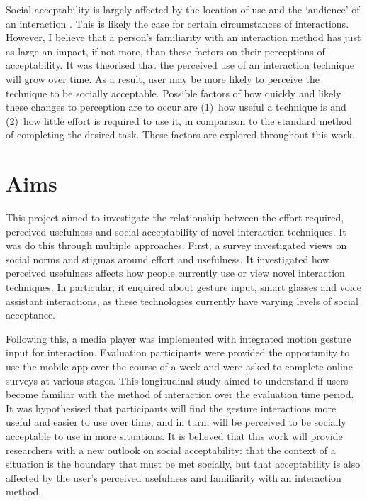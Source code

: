 \documentclass{l4proj}
\begin{document}
Social acceptability is largely affected by the location of use and the `audience' of an interaction \citep{rico_usable_2010}. This is likely the case for certain circumstances of interactions. However, I believe that a person’s familiarity with an interaction method has just as large an impact, if not more, than these factors on their perceptions of acceptability. It was theorised that the perceived use of an interaction technique will grow over time. As a result, user may be more likely to perceive the technique to be socially acceptable. Possible factors of how quickly and likely these changes to perception are to occur are (1)~how useful a technique is and (2)~how little effort is required to use it, in comparison to the standard method of completing the desired task. These factors are explored throughout this work.

\section{Aims}

This project aimed to investigate the relationship between the effort required, perceived usefulness and social acceptability of novel interaction techniques. It was do this through multiple approaches. First, a survey investigated views on social norms and stigmas around effort and usefulness. It investigated how perceived usefulness affects how people currently use or view novel interaction techniques. In particular, it enquired about gesture input, smart glasses and voice assistant interactions, as these technologies currently have varying levels of social acceptance.

Following this, a media player was implemented with integrated motion gesture input for interaction. Evaluation participants were provided the opportunity to use the mobile app over the course of a week and were asked to complete online surveys at various stages. This longitudinal study aimed to understand if users become familiar with the method of interaction over the evaluation time period. It was hypothesised that participants will find the gesture interactions more useful and easier to use over time, and in turn, will be perceived to be socially acceptable to use in more situations. It is believed that this work will provide researchers with a new outlook on social acceptability: that the context of a situation is the boundary that must be met socially, but that acceptability is also affected by the user's perceived usefulness and familiarity with an interaction method.
\end{document}
